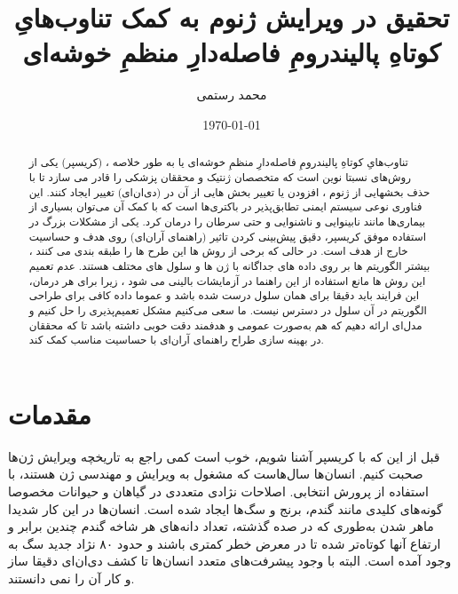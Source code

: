 \documentclass[12pt,a4paper,BCOR=.7cm,headsepline,bibliography=totoc]{report}
\title{تحقیق در ویرایش ژنوم به کمک تناوب‌هایِ کوتاهِ پالیندرومِ فاصله‌دارِ منظمِ خوشه‌ای}
\author{محمد رستمی }
\date{\today}
\begin{document}
\makethesistitle
{}
\begin{abstract}
تناوب‌هایِ کوتاهِ پالیندرومِ فاصله‌دارِ منظمِ خوشه‌ای یا به طور خلاصه ،  (کریسپر) یکی از روش‌های نسبتا نوین است که متخصصان ژنتیک و محققان پزشکی را قادر می سازد تا با حذف بخشهایی از ژنوم ،
افزودن یا تغییر بخش هایی از آن در  (دی‌ان‌ای) تغییر ایجاد کنند. این فناوری نوعی سیستم ایمنی تطابق‌پذیر در باکتری‌ها است که با کمک آن می‌توان بسیاری از بیماری‌ها مانند نابینوایی و ناشنوایی و حتی سرطان را درمان کرد. یکی از مشکلات بزرگ در استفاده موفق کریسپر، دقیق پیش‌بینی کردن تاثیر  (راهنمای آر‌ان‌ای) روی هدف و حساسیت خارج از هدف است. در حالی که برخی از روش ها این طرح ها را طبقه بندی می کنند ، بیشتر
الگوریتم ها بر روی داده های جداگانه با ژن ها و سلول های مختلف هستند. عدم تعمیم این روش ها
مانع استفاده از این راهنما در آزمایشات بالینی می شود ، زیرا برای هر درمان، این فرایند باید دقیقا برای همان سلول درست شده باشد و عموما داده کافی برای طراحی الگوریتم در آن سلول در دسترس نیست. ما سعی می‌کنیم مشکل تعمیم‌پذیری را حل کنیم و مدل‌ای ارائه دهیم که هم به‌صورت عمومی و هدفمند دقت خوبی داشته باشد تا که محققان در بهینه سازی طراح راهنمای آران‌ای با حساسیت مناسب کمک کند.
\end{abstract}
\pagestyle{plain}

\tableofcontents{} \listoffigures{}
\chapter{مقدمات}
\pagestyle{fancy} 
 قبل از این که با کریسپر آشنا شویم، خوب است کمی راجع به تاریخچه ویرایش ژن‌ها صحبت کنیم. انسان‌ها سال‌هاست که مشغول به ویرایش و مهندسی ژن هستند، با استفاده از پرورش انتخابی.
	اصلاحات نژادی متعددی در گیاهان و حیوانات مخصوصا گونه‌های کلیدی مانند گندم، برنج و سگ‌ها ایجاد شده است. انسان‌ها در این کار شدیدا ماهر شدن به‌طوری که در صده گذشته، تعداد دانه‌های هر شاخه گندم چندین برابر و ارتفاع آنها کوتاه‌تر شده تا در معرض خطر کمتری باشند و حدود ۸۰ نژاد جدید سگ به وجود آمده است. البته با وجود پیشرفت‌های متعدد انسان‌ها تا کشف دی‌ان‌ای دقیقا ساز و کار آن را نمی دانستند. 
	
\end{document}
